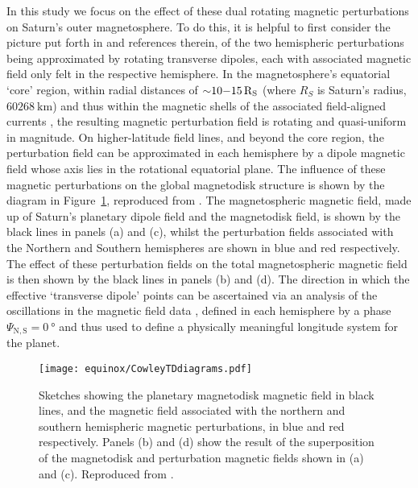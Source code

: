 In this study we focus on the effect of these dual rotating magnetic perturbations on Saturn's outer magnetosphere. To do this, it is helpful to first consider the picture put forth in \citet{andrews2010, provan2011} and references therein, of the two hemispheric perturbations being approximated by rotating transverse dipoles, each with associated magnetic field only felt in the respective hemisphere. In the magnetosphere's equatorial `core' region, within radial distances of ${\sim}10{\--}\SI{15}{R_S}$ (where $\si{R_S}$ is Saturn's radius, $\SI{60268}{\km}$) and thus within the magnetic shells of the associated field-aligned currents \citep[e.g.][]{southwood2007}, the resulting magnetic perturbation field is rotating and quasi-uniform in magnitude. On higher-latitude field lines, and beyond the core region, the perturbation field can be approximated in each hemisphere by a dipole magnetic field whose axis lies in the rotational equatorial plane. The influence of these magnetic perturbations on the global magnetodisk structure is shown by the diagram in Figure~\ref{equinox:fig:CowleyTDdiagrams}, reproduced from \citet{cowley2017a}. The magnetospheric magnetic field, made up of Saturn's planetary dipole field and the magnetodisk field, is shown by the black lines in panels (a) and (c), whilst the perturbation fields associated with the Northern and Southern hemispheres are shown in blue and red respectively. The effect of these perturbation fields on the total magnetospheric magnetic field is then shown by the black lines in panels (b) and (d). The direction in which the effective `transverse dipole' points can be ascertained via an analysis of the oscillations in the magnetic field data \citep[e.g.][]{provan2009}, defined in each hemisphere by a phase $\Psi_\mathrm{N,S} = \SI{0}{\degree}$ and thus used to define a physically meaningful longitude system for the planet.
\begin{figure}
\centering
\texttt{[image: equinox/CowleyTDdiagrams.pdf]}
\caption[Sketches of hemispheric rotating magnetic perturbation fields, from \citet{cowley2017a}.]{Sketches showing the planetary magnetodisk magnetic field in black lines, and the magnetic field associated with the northern and southern hemispheric magnetic perturbations, in blue and red respectively. Panels (b) and (d) show the result of the superposition of the magnetodisk and perturbation magnetic fields shown in (a) and (c). Reproduced from \citet{cowley2017a}.}
\label{equinox:fig:CowleyTDdiagrams}
\end{figure}

